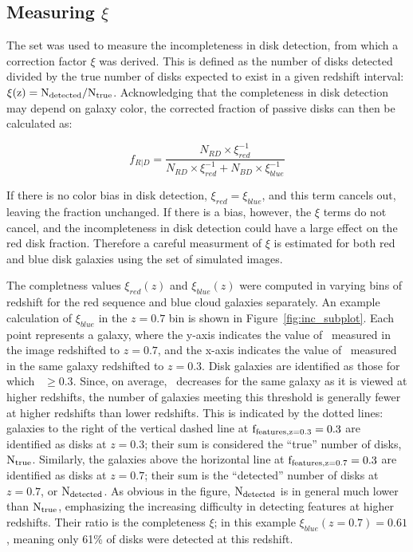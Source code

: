 \documentclass[useAMS,usenatbib]{mn2e}
\begin{document}
\subsection{Measuring $\xi$}
\label{ssec:xi}

The  set was used to measure the incompleteness in disk detection, from which a correction factor $\xi$ was derived. This is defined as the number of disks detected divided by the true number of disks expected to exist in a given redshift interval: $\rm \xi(z)=N_{detected}/N_{true}$. Acknowledging that the completeness in disk detection may depend on galaxy color, the corrected fraction of passive disks can then be calculated as:

\begin{equation}
f_{R|D}=\frac{N_{RD}\times \xi^{-1}_{red}}{N_{RD}\times \xi^{-1}_{red} + N_{BD} \times \xi^{-1}_{blue}}
\label{eqn:fdir}
\end{equation}

If there is no color bias in disk detection, $\xi_{red}=\xi_{blue}$, and this term cancels out, leaving the fraction unchanged. If there is a bias, however, the $\xi$ terms do not cancel, and the incompleteness in disk detection could have a large effect on the red disk fraction. Therefore a careful measurment of $\xi$ is estimated for both red and blue disk galaxies using the  set of simulated images.

The completness values $\xi_{red}(z)$ and $\xi_{blue}(z)$ were computed in varying bins of redshift for the red sequence and blue cloud galaxies separately. An example calculation of $\xi_{blue}$ in the $z=0.7$ bin is shown in Figure~\ref{fig:inc_subplot}. Each point represents a  galaxy, where the y-axis indicates the value of \ffeatures~measured in the image redshifted to $z=0.7$, and the x-axis indicates the value of \ffeatures~measured in the same galaxy redshifted to $z=0.3$. Disk galaxies are identified as those for which \ffeatures~$\ge0.3$. Since, on average, \ffeatures~decreases for the same galaxy as it is viewed at higher redshifts, the number of galaxies meeting this threshold is generally fewer at higher redshifts than lower redshifts. This is indicated by the dotted lines: galaxies to the right of the vertical dashed line at $\rm f_{features,z=0.3}=0.3$ are identified as disks at $z=0.3$; their sum is considered the ``true'' number of disks, $\rm N_{true}$. Similarly, the galaxies above the horizontal line at $\rm f_{features,z=0.7}=0.3$ are identified as disks at $z=0.7$; their sum is the ``detected'' number of disks at $z=0.7$, or $\rm N_{detected}$. As obvious in the figure, $\rm N_{detected}$ is in general much lower than $\rm N_{true}$, emphasizing the increasing difficulty in detecting features at higher redshifts. Their ratio is the completeness $\xi$; in this example $\xi_{blue}(z=0.7)=0.61$, meaning only 61\% of disks were detected at this redshift. 
\end{document}
